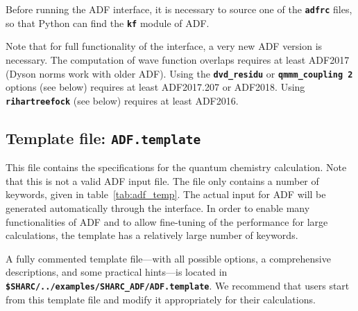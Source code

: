 \documentclass[a4paper,10pt,DIV=15,openany]{scrbook}
\newcommand{\ttt}[1]{\textbf{\texttt{#1}}}
\begin{document}
Before running the ADF interface, it is necessary to source one of the \ttt{adfrc} files, so that Python can find the \ttt{kf} module of ADF.

Note that for full functionality of the interface, a very new ADF version is necessary. The computation of wave function overlaps requires at least ADF2017 (Dyson norms work with older ADF). Using the \ttt{dvd\_residu} or \ttt{qmmm\_coupling 2} options (see below) requires at least ADF2017.207 or ADF2018. Using \ttt{rihartreefock} (see below) requires at least ADF2016. 

\subsection{Template file: \ttt{ADF.template}}

This file contains the specifications for the quantum chemistry calculation. Note that this is not a valid \textsc{ADF} input file. The file only contains a number of keywords, given in table~\ref{tab:adf_temp}. The actual input for \textsc{ADF} will be generated automatically through the interface.
In order to enable many functionalities of ADF and to allow fine-tuning of the performance for large calculations, the template has a relatively large number of keywords.

A fully commented template file---with all possible options, a comprehensive descriptions, and some practical hints---is located in \ttt{\$SHARC/../examples/SHARC\_ADF/ADF.template}.
We recommend that users start from this template file and modify it appropriately for their calculations.
\end{document}
